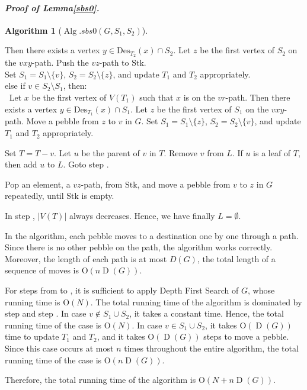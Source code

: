 \documentclass[letter,11pt]{article}
\newcommand{\white}{\qquad{\framebox{\rule{0pt}{4pt}}}}
\newcommand{\owari}{\hfill\white}
\theoremstyle{definition}
\theoremstyle{definition}
\newtheorem{alg}{Algorithm}
\DeclareMathOperator{\Alg}{Alg}
\DeclareMathOperator{\D}{D}
\newcommand{\1}{\boldmath$~1~$\unboldmath}
\newcommand{\Ord}{\mathrm{O}}
\newcommand{\qedgo}{\vspace{0.35cm}}
\newcommand{\tume}{\hspace*{0.2em}}
\newcommand{\maru}[1]{{\ooalign{\hfill$\small#1$\hfill\crcr\scalebox{1.3}{$\bigcirc$}}}}
\newenvironment{alg-enumerate}{%
  \begin{enumerate}%
   \renewcommand{\theenumi}{\arabic{enumi}}%
   \renewcommand{\labelenumi}{\rm{{\maru{\theenumi}}\tume\/}}%
   \renewcommand{\labelenumii}{\rm{$(${\maru{\theenumi}}-\theenumii$)$\tume\/}}%
 }{\end{enumerate}%
}
\newenvironment{Proofof}[1]{\expandafter
\paragraph{{\it Proof of #1.}}}{\hspace{5mm}\owari\qedgo}
\begin{document}
\begin{Proofof}{Lemma\tume\ref{sbs0}}
\begin{alg}[$\Alg.sbs0(G, S_1, S_2)$]
\begin{alg-enumerate}
Then there exists a vertex $y \in {\textrm{Des}}_{T_2}(x) \cap S_2$.
Let $z$ be the first vertex of $S_2$ on the $vxy$-path. 
Push the $vz$-path to $\textrm{Stk}$.\\
Set $S_1 = S_1 \setminus \{ v \}$, $S_2 = S_2 \setminus \{ z \}$, and update $T_1$ and $T_2$ appropriately.\\
else if $v \in S_2 \setminus S_1$, then:\\
$\ $ Let $x$ be the first vertex of $V(T_1)$ such that $x$ is on the $vr$-path.
Then there exists a vertex $y \in {\textrm{Des}}_{T_1}(x) \cap S_1$.
Let $z$ be the first vertex of $S_1$ on the $vxy$-path. 
Move a pebble from $z$ to $v$ in $G$.
Set $S_1 = S_1 \setminus \{ z \}$, $S_2 = S_2 \setminus \{ v \}$, and update $T_1$ and $T_2$ appropriately.\\
\item Set $T = T - v$.\label{sbs0_cut_v}
Let $u$ be the parent of $v$ in $T$.
Remove $v$ from $L$.
If $u$ is a leaf of $T$, then add $u$ to $L$.
Goto step \maru{\ref{sbs0_main}}. 
\item \label{sbs0_pop}
Pop an element, a $vz$-path, from $\textrm{Stk}$, and move a pebble from $v$ to $z$ in $G$  repeatedly, until $\textrm{Stk}$ is empty.
\end{alg-enumerate}
\end{alg}

In step \maru{\ref{sbs0_cut_v}}, $|V(T)|$ always decreases.
Hence, we have finally $L = \emptyset$.

In the algorithm, each pebble moves to a destination one by one through a path.
Since there is no other pebble on the path, the algorithm works correctly.
Moreover, the length of each path is at most $D(G)$, the total length of a sequence of moves is $\Ord (n\D(G))$.

For steps from \maru{\ref{sbs0_start0}} to \maru{\ref{sbs0_start1}}, it is sufficient to apply Depth First Search of $G$, whose running time is $\Ord (N)$.
The total running time of the algorithm is dominated by step \maru{\ref{sbs0_main}} and step  \maru{\ref{sbs0_pop}}.
In case $v \not\in S_1 \cup S_2$, it takes a constant time.
Hence, the total running time of the case is $\Ord (N)$. 
In case $v \in S_1 \cup S_2$, it takes $\Ord (\D(G))$ time to update $T_1$ and $T_2$, and it takes $\Ord (\D(G))$ steps to move a pebble.
Since this case occurs at most $n$ times throughout the entire algorithm, the total running time of the case is $\Ord (n\D(G))$.   

Therefore, the total running time of the algorithm is $\Ord (N + n\D(G))$. 
\end{Proofof} 
\end{document}
